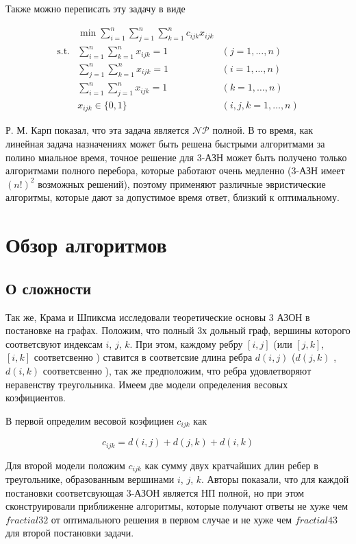\documentclass[14pt,a4paper]{article}
\begin{document}
Также можно переписать эту задачу в виде

\begin{eqnarray*}
  & \min \displaystyle \sum^n_{i = 1} \displaystyle \sum^n_{j = 1} \displaystyle \sum^n_{k = 1}
  c_{ijk} x_{ijk} \\
  \text{s.t.}
  &\displaystyle \sum^n_{i = 1} \displaystyle \sum^n_{k = 1} x_{ijk} = 1  &(j = 1, \ldots, n) \\
  &\displaystyle \sum^n_{j = 1} \displaystyle \sum^n_{k = 1} x_{ijk} = 1  &(i = 1, \ldots, n) \\
  &\displaystyle \sum^n_{i = 1} \displaystyle \sum^n_{j = 1} x_{ijk} = 1  &(k = 1, \ldots, n) \\
  & x_{ijk} \in \{ 0, 1 \} &(i,j,k = 1, \ldots, n)
\end{eqnarray*}

Р. М. Карп показал, что эта задача является $\mathcal{NP}$ полной. В то время,
как линейная задача назначениях может быть решена быстрыми алгоритмами за полино
миальное время, точное решение для 3-АЗН может быть получено только алгоритмами полного перебора, которые
работают очень медленно (3-АЗН имеет $(n!)^2$ возможных решений), поэтому
применяют различные эвристические алгоритмы, которые дают за допустимое время
ответ, близкий к оптимальному.

\section{Обзор алгоритмов}

\subsection{О сложности}
Так же, Крама и Шпиксма исследовали теоретические
основы 3 АЗОН
в постановке на графах. Положим, что полный
3х дольный граф, вершины которого соответсвуют
индексам $i$, $j$, $k$. При этом, каждому ребру
$\left[ i, j \right]$ (или $\left[ j, k \right]$,
$\left[ i, k \right]$ соответсвенно )
ставится в соответсвие длина ребра $d \left( i, j
\right)$ ($d \left( j, k \right)$ , $d \left( i,k
\right)$ соответсвенно ), так же предположим,
что ребра удовлетворяют неравенству треугольника.
Имеем две модели определения весовых коэфициентов.

В первой определим весовой коэфициен $c_{ijk}$ как

$$
	c_{ijk} =
	d \left( i, j \right) +
	d \left( j, k \right) +
	d \left( i, k \right)
$$

Для второй модели положим $c_{ijk}$ как сумму двух
кратчайших длин ребер в треугольнике, образованным
вершинами $i$, $j$, $k$. Авторы показали, что для
каждой постановки соответсвующая 3-АЗОН является
НП полной, но при этом сконструировали
приближенне алгоритмы, которые получают ответы
не хуже чем $fractial{3}{2}$ от оптимального решения
в первом случае и не хуже чем $fractial{4}{3}$ для
второй постановки задачи.
\end{document}
